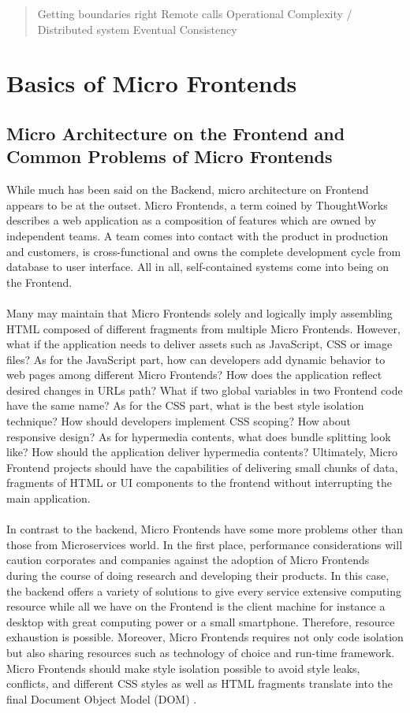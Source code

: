 \documentclass[a4paper]{book}
\begin{document}
\begin{quote}
	Getting boundaries right
Remote calls 
Operational Complexity / Distributed system
Eventual Consistency
\end{quote}

\chapter{Basics of Micro Frontends}
\section{Micro Architecture on the Frontend and Common Problems of Micro Frontends}
While much has been said on the Backend, micro architecture on Frontend appears to be at the outset. Micro Frontends, a term coined by ThoughtWorks describes a web application as a composition of features which are owned by independent teams. A team comes into contact with the product in production and customers, is cross-functional and owns the complete development cycle from database to user interface. All in all, self-contained systems come into being on the Frontend. \cite{micro-frontends.org}
\\ \\
Many may maintain that Micro Frontends solely and logically imply assembling HTML composed of different fragments from multiple Micro Frontends. However, what if the application needs to deliver assets such as JavaScript, CSS or image files? As for the JavaScript part, how can developers add dynamic behavior to web pages among different Micro Frontends? How does the application reflect desired changes in URLs path? What if two global variables in two Frontend code have the same name? As for the CSS part, what is the best style isolation technique? How should developers implement CSS scoping? How about responsive design? As for hypermedia contents, what does bundle splitting look like? How should the application deliver hypermedia contents? Ultimately, Micro Frontend projects should have the capabilities of delivering small chunks of data, fragments of HTML or UI components to the frontend without interrupting the main application.
\\ \\
In contrast to the backend, Micro Frontends have some more problems other than those from Microservices world. In the first place, performance considerations will caution corporates and companies against the adoption of Micro Frontends during the course of doing research and developing their products. In this case, the backend offers a variety of solutions to give every service extensive computing resource while all we have on the Frontend is the client machine for instance a desktop with great computing power or a small smartphone. Therefore, resource exhaustion is possible. Moreover, Micro Frontends requires not only code isolation but also sharing resources such as technology of choice and run-time framework. Micro Frontends should make style isolation possible to avoid style leaks, conflicts, and different CSS styles as well as HTML fragments translate into the final Document Object Model (DOM) \cite{DOM}.
\end{document}
